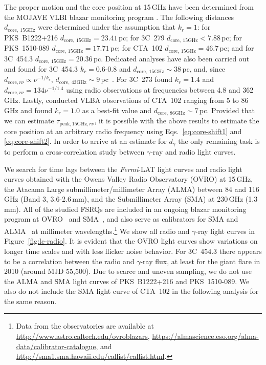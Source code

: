 \documentclass[twocolumn]{aastex62}
\newcommand{\gray}{$\gamma$-ray\xspace}
\newcommand{\fermiLAT}{\emph{Fermi}-LAT\xspace}
\begin{document}
The proper motion and the core position at 15\,GHz have been determined from
the MOJAVE VLBI blazar monitoring program  \citep[][]{2012A&A...545A.113P,2016AJ....152...12L}.
The following distances $d_\mathrm{core,~15GHz}$ were determined  under the assumption that $k_r = 1$: for PKS~B1222+216 $d_\mathrm{core,~15GHz}= 23.41\,$pc; for 3C~279 $d_\mathrm{core,~15GHz}<7.88$\,pc; for PKS~1510-089 $d_\mathrm{core,~15GHz} = 17.71\,$pc; for 
CTA~102 $d_\mathrm{core,~15GHz} =46.7\,$pc; and for 3C~454.3 $d_\mathrm{core,~15GHz} = 20.36\,$pc.
Dedicated analyses have also been carried out and found for 3C~454.3 $k_r = 0.6$-$0.8$ and $d_\mathrm{core,~15GHz} \sim 38\,$pc, and, since $d_{\mathrm{core},r\nu}\propto\nu^{-1/k_r}$,  $d_\mathrm{core,~43GHz} \sim 9\,$pc~\citep{2014MNRAS.437.3396K}. 
For 3C~273 \citet{2013ARep...57...34V} found $k_r = 1.4$ and $d_{\mathrm{core},r\nu} = 134\nu^{-1/1.4}$ using radio observations at frequencies between 4.8 and 362 GHz.
Lastly, \citet{2015A&A...576A..43F} conducted VLBA observations of CTA~102 ranging from 5 to 86\,GHz and found $k_r = 1.0$ as a best-fit value and $d_{\mathrm{core,~86GHz}}\sim7\,$pc.
Provided that we can estimate $\tau_{\mathrm{peak,15GHz},r\nu}$, it is possible with the above results to estimate the core position at an arbitrary radio frequency using Eqs.~\ref{eq:core-shift1} and \ref{eq:core-shift2}.
In order to arrive at an estimate for $d_\gamma$ the only remaining task is to perform a cross-correlation study between \gray and radio light curves.

We search for time lags between the \fermiLAT light curves and radio light curves obtained with the Owens Valley Radio Observatory (OVRO) at 15\,GHz, the Atacama Large submillimeter/millimeter Array (ALMA) between 84 and 116\,GHz (Band 3, 3.6-2.6\,mm), and the Submillimeter Array (SMA) at 230\,GHz (1.3\,mm). 
All of the studied FSRQs are included in an ongoing blazar monitoring program at OVRO~\citep{2011ApJS..194...29R} and SMA~\citep{2007ASPC..375..234G}, and also serve as calibrators for SMA and ALMA~\citep{2018MNRAS.478.1512B} at millimeter wavelengths.\footnote{Data from the observatories are available at \url{http://www.astro.caltech.edu/ovroblazars}, \url{https://almascience.eso.org/alma-data/calibrator-catalogue}, and \url{http://sma1.sma.hawaii.edu/callist/callist.html}.}
We show all radio and \gray light curves in Figure~\ref{fig:lc-radio}.
It is evident that the OVRO light curves show variations on longer time scales and with less flicker noise behavior. 
For 3C~454.3 there appears to be a correlation between the radio and \gray flux, at least for the giant flare in 2010 (around MJD 55,500). 
Due to scarce and uneven sampling, we do not use the ALMA and SMA light curves of PKS~B1222+216 and PKS~1510-089.
We also do not include the SMA light curve of CTA~102 in the following analysis for the same reason.
\end{document}

